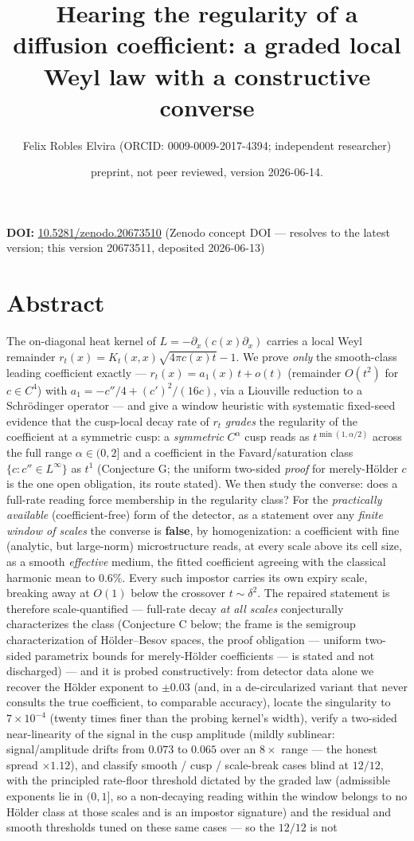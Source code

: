 \documentclass[11pt]{article}
\title{Hearing the regularity of a diffusion coefficient: a graded local Weyl law with a constructive converse}
\author{Felix Robles Elvira (ORCID: 0009-0009-2017-4394; independent researcher)}
\date{\small preprint, not peer reviewed, version 2026-06-14.}
\begin{document}
\maketitle

\textbf{DOI:} \href{https://doi.org/10.5281/zenodo.20673510}{10.5281/zenodo.20673510} (Zenodo concept DOI — resolves to the latest version; this version 20673511, deposited 2026-06-13)

\section*{Abstract}
The on-diagonal heat kernel of $L = -\partial_x(c(x)\partial_x)$ carries a local Weyl remainder $r_t(x) = K_t(x,x)\sqrt{4\pi c(x)t} - 1$.  We prove \emph{only} the smooth-class leading coefficient exactly — $r_t(x) = a_1(x)\,t + o(t)$ (remainder $O(t^2)$ for $c \in C^4$) with $a_1 = -c''/4 + (c')^2/(16c)$, via a Liouville reduction to a Schrödinger operator — and give a window heuristic with systematic fixed-seed evidence that the cusp-local decay rate of $r_t$ \emph{grades} the regularity of the coefficient at a symmetric cusp: a \emph{symmetric} $C^\alpha$ cusp reads as $t^{\min(1,\alpha/2)}$ across the full range $\alpha \in (0,2]$ and a coefficient in the Favard/saturation class $\{c : c'' \in L^\infty\}$ as $t^1$ (Conjecture G; the uniform two-sided \emph{proof} for merely-Hölder $c$ is the one open obligation, its route stated).  We then study the converse: does a full-rate reading force membership in the regularity class?  For the \emph{practically available} (coefficient-free) form of the detector, as a statement over any \emph{finite window of scales} the converse is \textbf{false}, by homogenization: a coefficient with fine (analytic, but large-norm) microstructure reads, at every scale above its cell size, as a smooth \emph{effective} medium, the fitted coefficient agreeing with the classical harmonic mean to $0.6\%$.  Every such impostor carries its own expiry scale, breaking away at $O(1)$ below the crossover $t \sim \delta^2$.  The repaired statement is therefore scale-quantified — full-rate decay \emph{at all scales} conjecturally characterizes the class (Conjecture C below; the frame is the semigroup characterization of Hölder–Besov spaces, the proof obligation — uniform two-sided parametrix bounds for merely-Hölder coefficients — is stated and not discharged) — and it is probed constructively: from detector data alone we recover the Hölder exponent to $\pm 0.03$ (and, in a de-circularized variant that never consults the true coefficient, to comparable accuracy), locate the singularity to $7\times 10^{-4}$ (twenty times finer than the probing kernel's width), verify a two-sided near-linearity of the signal in the cusp amplitude (mildly sublinear: signal/amplitude drifts from $0.073$ to $0.065$ over an $8\times$ range — the honest spread $\times 1.12$), and classify smooth / cusp / scale-break cases blind at $12/12$, with the principled rate-floor threshold dictated by the graded law (admissible exponents lie in $(0,1]$, so a non-decaying reading within the window belongs to no Hölder class at those scales and is an impostor signature) and the residual and smooth thresholds tuned on these same cases — so the $12/12$ is not 
\end{document}

